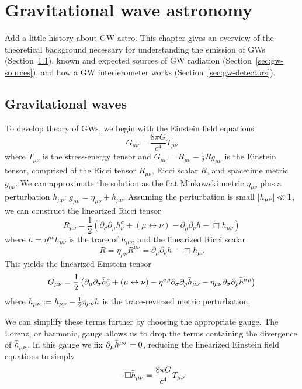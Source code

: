 \chapter{Gravitational wave astronomy}\label{ch:gw}

{\color{red}
Add a little history about GW astro.}
This chapter gives an overview of the theoretical background necessary for understanding the emission of \acp{GW} (Section~\ref{sec:gw-gr}), known and expected sources of \ac{GW} radiation (Section~\ref{sec:gw-sources}), and how a \ac{GW} interferometer works (Section~\ref{sec:gw-detectors}).

\section{Gravitational waves}\label{sec:gw-gr}

To develop theory of \acp{GW}, we begin with the Einstein field equations
$$G_{\mu\nu} = \frac{8\pi G}{c^4} T_{\mu\nu}$$
where $T_{\mu\nu}$ is the stress-energy tensor and $G_{\mu\nu} = R_{\mu\nu} - \frac{1}{2} R g_{\mu\nu}$ is the Einstein tensor, comprised of the Ricci tensor $R_{\mu\nu}$, Ricci scalar $R$, and spacetime metric $g_{\mu\nu}$.
We can approximate the solution as the flat Minkowski metric $\eta_{\mu\nu}$ plus a perturbation $h_{\mu\nu}$: $g_{\mu \nu} = \eta_{\mu \nu} + h_{\mu \nu}$.
Assuming the perturbation is small $\abs{h_{\mu\nu}} \ll 1$, we can construct the linearized Ricci tensor
$$R_{\mu\nu} = \frac{1}{2} (\partial_{\sigma}\partial_{\mu}h_{\nu}^{\sigma} + (\mu \leftrightarrow \nu) - \partial_{\mu}\partial_{\nu}h - \Box h_{\mu\nu})$$
where $h = \eta^{\mu\nu}h_{\mu\nu}$ is the trace of $h_{\mu\nu}$, and the linearized Ricci scalar
$$R = \eta_{\mu\nu}R^{\mu\nu} = \partial_{\mu}\partial_{\nu}h - \Box h_{\mu\nu}$$
This yields the linearized Einstein tensor
$$G_{\mu\nu} = \frac{1}{2} \left( \partial_{\mu}\partial_{\sigma}\Bar{h}_{\nu}^{\rho} + (\mu \leftrightarrow \nu) - \eta^{\sigma\rho}\partial_{\sigma}\partial_{\rho}\Bar{h}_{\mu\nu} - \eta_{\mu\nu}\partial_{\sigma}\partial_{\rho}\Bar{h}^{\sigma\rho} \right)$$
where $\Bar{h}_{\mu\nu} := h_{\mu\nu} - \frac{1}{2}\eta_{\mu\nu}h$ is the trace-reversed metric perturbation.

We can simplify these terms further by choosing the appropriate gauge.
The Lorenz, or harmonic, gauge allows us to drop the terms containing the divergence of $\Bar{h}_{\mu\nu}$.
In this gauge we fix $\partial_{\mu}\Bar{h}^{\mu\sigma} = 0$, reducing the linearized Einstein field equations to simply
\begin{equation}\label{eq:EFE}
	-\Box \Bar{h}_{\mu\nu} = \frac{8\pi G}{c^4} T_{\mu\nu}
\end{equation}

